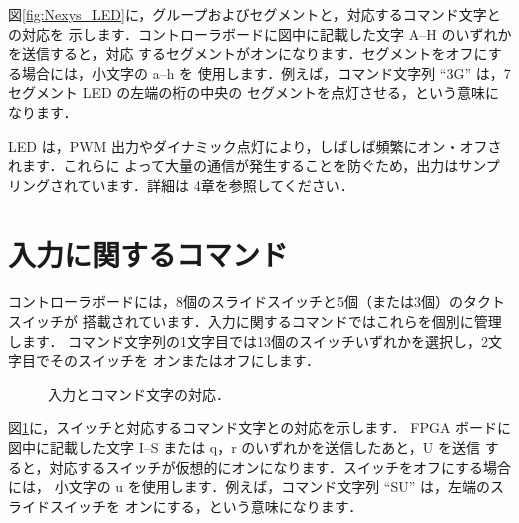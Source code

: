 図\ref{fig:Nexys_LED}に，グループおよびセグメントと，対応するコマンド文字との対応を
示します．コントローラボードに図中に記載した文字 A--H のいずれかを送信すると，対応
するセグメントがオンになります．セグメントをオフにする場合には，小文字の a--h を
使用します．例えば，コマンド文字列 ``3G'' は，7セグメント LED の左端の桁の中央の
セグメントを点灯させる，という意味になります．

LED は，PWM 出力やダイナミック点灯により，しばしば頻繁にオン・オフされます．これらに
よって大量の通信が発生することを防ぐため，出力はサンプリングされています．詳細は
4章を参照してください．

\section{入力に関するコマンド}

コントローラボードには，8個のスライドスイッチと5個（または3個）のタクトスイッチが
搭載されています．入力に関するコマンドではこれらを個別に管理します．
コマンド文字列の1文字目では13個のスイッチいずれかを選択し，2文字目でそのスイッチを
オンまたはオフにします．

\begin{figure}[ht]
 \centering
 \caption{入力とコマンド文字の対応．}
 \label{fig:Nexys_SW}
\end{figure}

図\ref{fig:Nexys_SW}に，スイッチと対応するコマンド文字との対応を示します．
FPGA ボードに図中に記載した文字 I--S または q，r のいずれかを送信したあと，U を送信
すると，対応するスイッチが仮想的にオンになります．スイッチをオフにする場合には，
小文字の u を使用します．例えば，コマンド文字列 ``SU'' は，左端のスライドスイッチを
オンにする，という意味になります．

